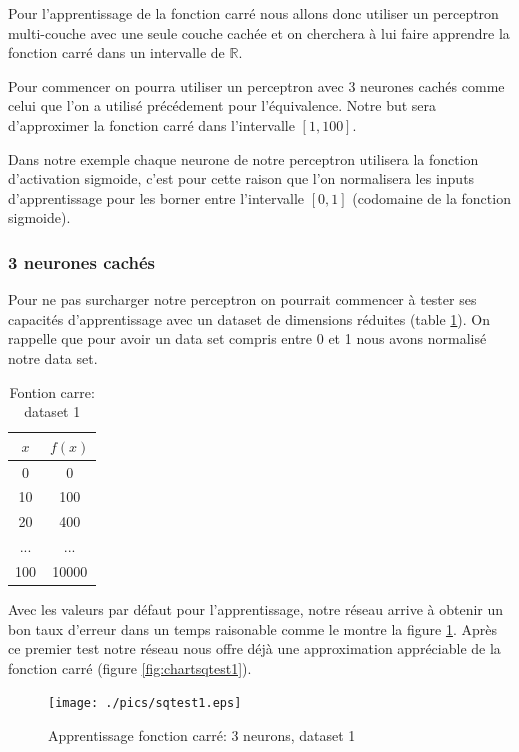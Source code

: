 \documentclass[twoside,openright,a4paper,11pt,french]{article}
\begin{document}
Pour l'apprentissage de la fonction carré nous allons donc utiliser un perceptron
multi-couche avec une seule couche cachée et on cherchera à lui faire apprendre
la fonction carré dans un intervalle de $\mathbb{R}$.

Pour commencer on pourra utiliser un perceptron avec 3 neurones cachés comme
celui que l'on a utilisé précédement pour l'équivalence. Notre but sera
d'approximer la fonction carré dans l'intervalle $[1,100]$.

Dans notre exemple chaque neurone de notre perceptron utilisera la fonction
d'activation sigmoide, c'est pour cette raison que l'on normalisera les inputs
d'apprentissage pour les borner entre l'intervalle $[0,1]$ (codomaine de la
fonction sigmoide).

\subsubsection{3 neurones cachés}

Pour ne pas surcharger notre  perceptron on pourrait commencer à tester
ses capacités d'apprentissage avec un dataset de dimensions réduites (table
\ref{tab:fqt1}). On rappelle que pour avoir un data set compris entre 0 et 1
nous avons normalisé notre data set.

\begin{table}[ht]
  \centering
  \begin{tabular}{| c | c |}
    \hline
    \textbf{$x$} & \textbf{$f(x)$}\\
    \hline
    0 & 0 \\
    \hline
    10 & 100 \\
    \hline
    20 & 400 \\
    \hline
    ... & ... \\
    \hline
    100 & 10000 \\
    \hline
  \end{tabular}
  \caption{Fontion carre: dataset 1}
  \label{tab:fqt1}
\end{table}

Avec les valeurs par défaut pour l'apprentissage, notre réseau arrive à obtenir
un bon taux d'erreur dans un temps raisonable comme le montre la figure
\ref{fig:sqtest1}. Après ce premier test notre réseau nous offre déjà une
approximation appréciable de la fonction carré (figure \ref{fig:chartsqtest1}).

\begin{figure}[ht]
\centering
\texttt{[image: ./pics/sqtest1.eps]}
\caption{Apprentissage fonction carré: 3 neurons, dataset 1}
\label{fig:sqtest1}
\end{figure}
\end{document}
